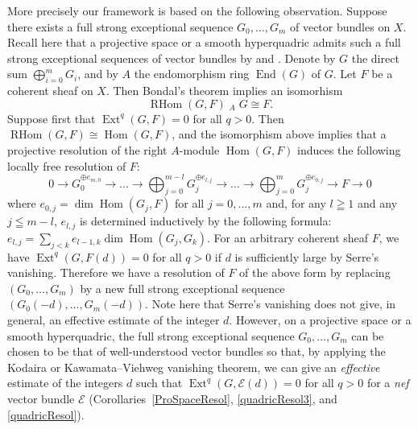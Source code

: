 \documentclass[a4paper,12pt]{amsart}
\DeclareMathOperator{\Hom}{Hom}
\DeclareMathOperator{\Ext}{Ext}
\DeclareMathOperator{\RHom}{RHom}
\DeclareMathOperator{\lotimes}{\otimes^{\mathbb{L}}}
\DeclareMathOperator{\End}{End}
\begin{document}
More precisely our framework is based on the following observation.
Suppose there exists a full strong exceptional sequence
$G_0,\dots,G_m$ 
of vector bundles on $X$.
Recall here that 
a projective space or a smooth hyperquadric
admits such a full strong exceptional sequences 
of vector bundles
by \cite{MR0509388} and \cite{MR0939472}.
Denote by $G$ the direct sum $\bigoplus _{i=0}^m G_i$,
and by $A$ the endomorphism ring $\End(G)$ of $G$.
Let $F$ be a coherent sheaf on $X$. 
Then Bondal's theorem \cite[Theorem 6.2]{MR992977} implies an isomorhism
\[\RHom(G,F)\lotimes_A G\cong F.\]
Suppose first that $\Ext^q(G,F)=0$ for all $q>0$.
Then $\RHom(G,F)\cong \Hom(G,F)$, and 
the isomorphism above implies that a projective resolution of the right $A$-module $\Hom(G,F)$
induces the following locally free resolution of $F$:
\[0\to G_0^{\oplus e_{m,0}}\to\dots\to \bigoplus_{j=0}^{m-l}G_{j}^{\oplus e_{l,j}}\to\dots\to
\bigoplus_{j=0}^{m}G_{j}^{\oplus e_{0,j}}\to F\to 0\]
where $e_{0,j}=\dim \Hom(G_j,F)$ for all $j=0,\dots,m$
and, for any $l\geqq 1$ and any $j\leqq m-l$, $e_{l,j}$ is determined inductively by the following formula:
$e_{l,j}=\sum_{j<k}e_{l-1,k}\dim \Hom(G_j,G_k)$.
For an arbitrary coherent sheaf $F$, 
we have $\Ext^q(G,F(d))=0$ for all $q>0$ if $d$ is sufficiently large by Serre's vanishing.
Therefore we have a resolution of $F$ of the above form
by replacing $(G_0,\dots, G_m)$ by a new full strong exceptional sequence $(G_0(-d),\dots,G_m(-d))$.
Note here that Serre's vanishing does not give, in general, an effective estimate
of the integer $d$. 
However, on a projective space
or a smooth hyperquadric, 
the full strong exceptional sequence $G_0,\dots,G_m$
can be chosen to be that of well-understood vector bundles 
so that, by applying the Kodaira or Kawamata--Viehweg vanishing theorem, we can give an 
\textit{effective} 
estimate
of the integers $d$
such that $\Ext^q(G,\mathcal{E}(d))=0$ for all $q>0$ 
for a \textit{nef} vector bundle $\mathcal{E}$
(Corollaries~\ref{ProSpaceResol}, \ref{quadricResol3}, and \ref{quadricResol}).
\end{document}

